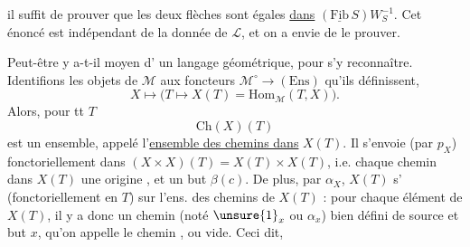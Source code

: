il suffit de prouver que les deux flèches sont égales \uline{dans} $(\underline{\mathrm{Fib}}\,S)W_S^{-1}$. Cet énoncé est indépendant de la donnée de $\mathcal L$, et on a envie de le prouver.

Peut-être y a-t-il moyen d' un langage géométrique, pour s'y reconnaître.  Identifions les objets  de $\mathcal M$ aux foncteurs $\mathcal M^\circ\longrightarrow(\mathrm{Ens})$ qu'ils définissent,
\[
X\longmapsto\bigl(T\longmapsto X(T)=\mathrm{Hom}_{\mathcal M}(T,X)\bigr)\text{.}
\]
Alors, pour tt $T$
\[
\mathrm{Ch}(X)(T)
\]
est un ensemble, appelé l'\uline{ensemble des chemins dans} $X(T)$. Il s'envoie (par $p_X$) fonctoriellement  dans $(X\times X)(T)=X(T)\times X(T)$, i.e. chaque chemin  dans $X(T)$  une origine , et un but $\beta(c)$. De plus, par $\alpha_X$, $X(T)$ s' (fonctoriellement en $T$) sur l'ens. des chemins de $X(T)$ : pour chaque élément  de $X(T)$, il y a donc un chemin (noté $\unsure{1}_x$ ou $\alpha_x$)  bien défini de source et but $x$, qu'on appelle le chemin , ou vide. Ceci dit,
